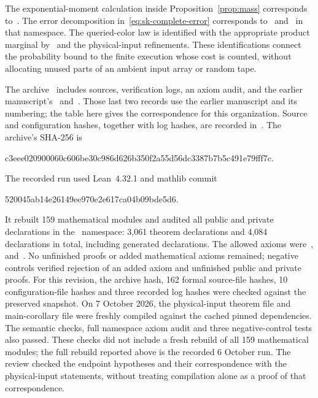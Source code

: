 \documentclass[10pt]{article}
\theoremstyle{plain}
\theoremstyle{definition}
\theoremstyle{remark}
\begin{document}
The exponential-moment calculation inside Proposition~\ref{prop:mass} corresponds to~. The error decomposition in~\eqref{eq:sk-complete-error} corresponds to~ and~ in that namespace. The queried-color law is identified with the appropriate product marginal by~ and the physical-input refinements. These identifications connect the probability bound to the finite execution whose cost is counted, without allocating unused parts of an ambient input array or random tape.

The archive~ includes sources, verification logs, an axiom audit, and the earlier manuscript's~ and~. Those last two records use the earlier manuscript and its numbering; the table here gives the correspondence for this organization. Source and configuration hashes, together with log hashes, are recorded in~. The archive's SHA-256 is
\begin{center}
\small\ttfamily c3eee020900060c606be30c986d626b350f2a55d56dc3387b7b5c491e79fff7c.
\end{center}

The recorded run used Lean~4.32.1 and mathlib commit
\begin{center}
\small\ttfamily 520045ab14e26149ee970e2e617ca04b09bde5d6.
\end{center}
It rebuilt 159 mathematical modules and audited all public and private declarations in the~ namespace: 3,061 theorem declarations and 4,084 declarations in total, including generated declarations. The allowed axioms were~,  and~. No unfinished proofs or added mathematical axioms remained; negative controls verified rejection of an added axiom and unfinished public and private proofs. For this revision, the archive hash, 162 formal source-file hashes, 10 configuration-file hashes and three recorded log hashes were checked against the preserved snapshot. On 7 October 2026, the physical-input theorem file and main-corollary file were freshly compiled against the cached pinned dependencies. The semantic checks, full namespace axiom audit and three negative-control tests also passed. These checks did not include a fresh rebuild of all 159 mathematical modules; the full rebuild reported above is the recorded 6 October run. The review checked the endpoint hypotheses and their correspondence with the physical-input statements, without treating compilation alone as a proof of that correspondence.
\end{document}
